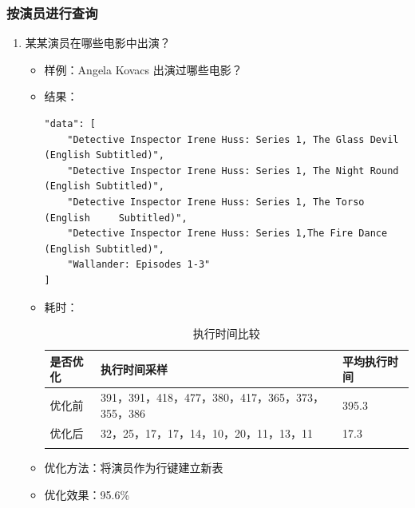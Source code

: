 \documentclass{ctexrep}
\begin{document}
	\subsubsection{按演员进行查询}
	    \begin{enumerate}
	        \item 某某演员在哪些电影中出演？
    	        \begin{itemize}
    	            \item 样例：Angela Kovacs 出演过哪些电影？
    	            \item 结果：
						\begin{lstlisting}
"data": [
	"Detective Inspector Irene Huss: Series 1, The Glass Devil (English Subtitled)",
	"Detective Inspector Irene Huss: Series 1, The Night Round (English Subtitled)",
	"Detective Inspector Irene Huss: Series 1, The Torso (English     Subtitled)",
	"Detective Inspector Irene Huss: Series 1,The Fire Dance (English Subtitled)",
	"Wallander: Episodes 1-3"
]
    	                \end{lstlisting}
    	            \item 耗时：
    	                \begin{longtable}{l|p{5cm}|l}
    	                    \hline
    	                    是否优化 & 执行时间采样 & 平均执行时间\\
    	                    \hline
    	                    \hline
    	                    优化前 & 391，391，418，477，380，417，365，373，355，386 & 395.3\\
    	                    优化后 & 32，25，17，17，14，10，20，11，13，11 & 17.3\\
    	                    \hline
    	                    \caption{执行时间比较}
    	                \end{longtable}
    	            \item 优化方法：将演员作为行键建立新表
    	            \item 优化效果：95.6\%
    	        \end{itemize}
		\end{enumerate}
\end{document}
